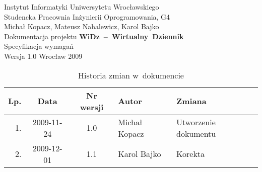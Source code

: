 \documentclass[12pt,leqno,twoside]{mwart}
\begin{document}
\begin{titlepage}
\begin{center}
Instytut Informatyki Uniwersytetu Wrocławskiego \\
Studencka Pracownia Inżynierii Oprogramowania, G4 \\
\vspace{4cm}
\Large Michał Kopacz, Mateusz Nahalewicz, Karol Bajko \\
\vspace{0.5cm}
\huge Dokumentacja projektu \mbox{\textbf{WiDz -- Wirtualny Dziennik}} \\ \Large Specyfikacja wymagań\\
\vspace{1cm}
\normalsize Wersja 1.0
\vfill
\normalsize Wrocław 2009
\end{center}
\end{titlepage}

\newpage

\begin{table}
	\centering
	\caption{Historia zmian w~dokumencie}
		\begin{tabular}{|r|c|c|l|l|}
		\hline
		Lp. 	& Data       & Nr wersji 	& Autor           		& Zmiana \\ \hline
		1.   	& 2009-11-24 & 1.0       	& Michał Kopacz & Utworzenie dokumentu \\ \hline
		2.		& 2009-12-01 & 1.1			& Karol Bajko & Korekta	\\ \hline
		\end{tabular}
\end{table}

\newpage

\tableofcontents

\newpage
\end{document}
